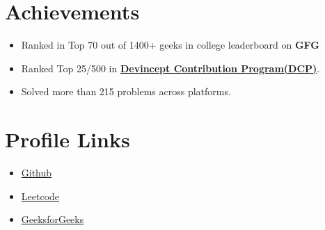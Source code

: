 \documentclass[letterpaper,11pt]{article}
\newcommand{\resumeItem}[1]{
  \item\small{
	{#1 \vspace{-2pt}}
  }
}
\newcommand{\resumeItemListStart}{\begin{itemize}}
\newcommand{\resumeItemListEnd}{\end{itemize}\vspace{-5pt}}
\begin{document}
%
\section{Achievements}
 \begin{itemize}[leftmargin=0.15in, label={}]
	\resumeItemListStart
	
	    \resumeItem{Ranked in Top 70 out of 1400+ geeks in college leaderboard on \textbf{GFG}}
	
    	\resumeItem{Ranked Top 25/500 in \textbf{{\href{https://dcp.devincept.com/}{Devincept Contribution Program(DCP)}}}.}
    	\resumeItem{Solved more than 215 problems across platforms.}
  	\resumeItemListEnd
 \end{itemize}
 \vspace{-16pt}
 
\section{Profile Links}
 \begin{itemize}[leftmargin=0.15in, label={}]
	\resumeItemListStart
    	\resumeItem 
    	{\href{https://github.com/Sourav61/}{Github}}
    	\resumeItem
        {\href{https://leetcode.com/whitedevil9/}{Leetcode}}
    	\resumeItem {\href{https://auth.geeksforgeeks.org/user/sourav61pahwa/practice}{GeeksforGeeks}}
  	\resumeItemListEnd
 \end{itemize}
 \vspace{-16pt}
\end{document}
